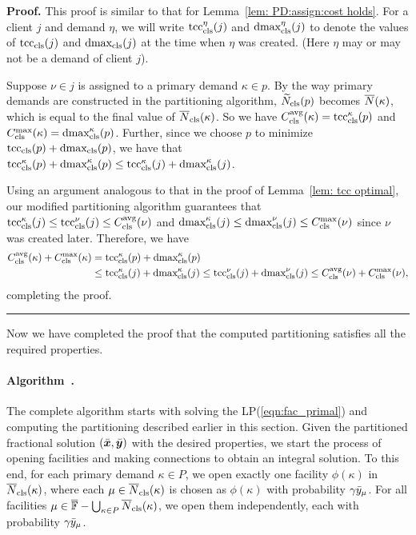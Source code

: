 \documentclass[oneside,final]{ucr}
\newenvironment{proof}[1][Proof]{\textbf{#1.} }{\ \rule{0.5em}{0.5em}}
\begin{document}
\begin{proof}
This proof is similar to that for Lemma~\ref{lem: PD:assign:cost holds}.
For a client $j$ and demand $\eta$, we will write
$\tcccls^\eta(j)$ and $\dmaxcls^\eta(j)$ to denote the values of
$\tcccls(j)$ and $\dmaxcls(j)$ at the time when $\eta$
was created. (Here $\eta$ may or may not be a demand of client $j$).

Suppose $\nu \in j$ is assigned to a primary demand $\kappa \in p$.
By the way primary demands are constructed in the partitioning
algorithm, $\wtildeclsnb(p)$ becomes $\wbarN(\kappa)$, which is equal
to the final value of $\wbarclsnb(\kappa)$. So we have
$\clsdist(\kappa) = \tcccls^\kappa (p)$ and $\clsmax(\kappa) =
\dmaxcls^\kappa(p)$. Further, since we choose $p$ to minimize
$\tcccls(p) + \dmaxcls(p)$, we have that $\tcccls^\kappa(p) +
\dmaxcls^\kappa(p) \leq \tcccls^\kappa(j) + \dmaxcls^\kappa(j)$.

Using an argument analogous to that in the proof of Lemma~\ref{lem: tcc optimal}, 
our modified partitioning algorithm guarantees that
  $\tcccls^{\kappa}(j) \leq \tcccls^{\nu}(j) \leq \clsdist(\nu)$ and
  $\dmaxcls^{\kappa}(j) \leq \dmaxcls^{\nu}(j) \leq \clsmax(\nu)$ since $\nu$ was
  created later.
  Therefore, we have
%
  \begin{align*}
    \clsdist(\kappa) + \clsmax(\kappa) &= \tcccls^{\kappa}(p) +	\dmaxcls^{\kappa}(p) 
					\\
					&\leq \tcccls^{\kappa}(j) + \dmaxcls^{\kappa}(j) 
					\leq \tcccls^{\nu}(j) + \dmaxcls^{\nu}(j) 
					\leq \clsdist(\nu) + \clsmax(\nu),
  \end{align*}
%
completing the proof.
\end{proof}


Now we have completed the proof that the computed partitioning satisfies
all the required properties. 


\paragraph{Algorithm~{\EBGS}.}
The complete algorithm starts with solving the LP(\ref{eqn:fac_primal}) and
computing the partitioning described earlier in this section.  Given
the partitioned fractional solution $(\barbfx, \barbfy)$ with the
desired properties, we start the process of opening facilities and
making connections to obtain an integral solution. To this end, for
each primary demand $\kappa\in P$, we open exactly one facility
$\phi(\kappa)$ in $\wbarclsnb(\kappa)$, where each
$\mu\in\wbarclsnb(\kappa)$ is chosen as $\phi(\kappa)$ with
probability $\gamma\bary_{\mu}$. For all facilities
$\mu\in\facilityset - \bigcup_{\kappa\in P}\wbarclsnb(\kappa)$, we
open them independently, each with probability
$\gamma\bary_{\mu}$. 
\end{document}
